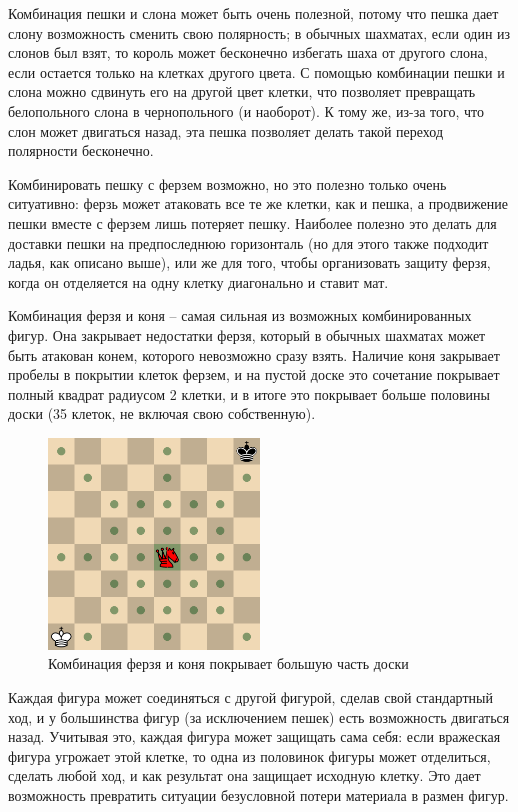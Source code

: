\documentclass{article}
\begin{document}
Комбинация пешки и слона может быть очень полезной,
потому что пешка дает слону возможность сменить свою полярность;
в обычных шахматах, если один из слонов был взят,
то король может бесконечно избегать шаха от другого слона,
если остается только на клетках другого цвета.
С помощью комбинации пешки и слона можно сдвинуть его на другой цвет клетки,
что позволяет превращать белопольного слона в чернопольного (и наоборот).
К тому же, из-за того, что слон может двигаться назад,
эта пешка позволяет делать такой переход полярности бесконечно.

Комбинировать пешку с ферзем возможно, но это полезно только очень ситуативно:
ферзь может атаковать все те же клетки, как и пешка,
а продвижение пешки вместе с ферзем лишь потеряет пешку.
Наиболее полезно это делать для доставки пешки на предпоследнюю горизонталь (но для этого также подходит ладья, как описано выше),
или же для того, чтобы организовать защиту ферзя, когда он отделяется на одну клетку диагонально и ставит мат.

Комбинация ферзя и коня -- самая сильная из возможных комбинированных фигур.
Она закрывает недостатки ферзя,
который в обычных шахматах может быть атакован конем,
которого невозможно сразу взять. 
Наличие коня закрывает пробелы в покрытии клеток ферзем,
и на пустой доске это сочетание покрывает полный квадрат радиусом 2 клетки,
и в итоге это покрывает больше половины доски (35 клеток, не включая свою собственную).

\begin{figure}[h]
    \centering
    \includegraphics[width=0.5\textwidth]{img/queen-knight-demo.png}
    \caption{Комбинация ферзя и коня покрывает большую часть доски}
\end{figure}


Каждая фигура может соединяться с другой фигурой,
сделав свой стандартный ход,
и у большинства фигур (за исключением пешек)
есть возможность двигаться назад.
Учитывая это, каждая фигура может защищать сама себя:
если вражеская фигура угрожает этой клетке,
то одна из половинок фигуры может отделиться,
сделать любой ход,
и как результат она защищает исходную клетку.
Это дает возможность превратить ситуации безусловной потери материала в размен фигур.
\end{document}
